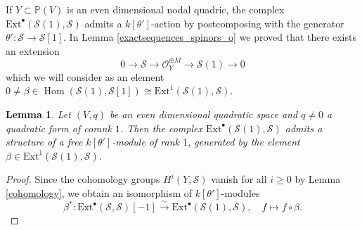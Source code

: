 \documentclass[a4paper, twoside, 11pt]{amsart}
\newtheorem{lemma}[theorem]{Lemma}
\theoremstyle{definition}
\theoremstyle{remark}
\numberwithin{equation}{theorem}
\DeclareMathOperator{\Hom}{Hom}
\begin{document}
If $Y \subset \mathbb{P}(V)$ is an even dimensional nodal quadric, the complex $\mathrm{Ext}^{\bullet}(\mathcal{S}(1), \mathcal{S})$ admits a $k[\theta']$-action by postcomposing with the generator $\theta'\colon \mathcal{S} \to \mathcal{S}[1]$. In Lemma \ref{exactsequences_spinors_o} we proved that there exists an extension
    \begin{equation*}
		0 \longrightarrow \mathcal{S} \longrightarrow \mathcal{O}_Y^{\oplus M} \longrightarrow \mathcal{S}(1)\longrightarrow 0
	\end{equation*}
 which we will consider as an element $0 \neq \beta \in \Hom(\mathcal{S}(1), \mathcal{S}[1]) \cong \mathrm{Ext}^{1}(\mathcal{S}(1), \mathcal{S})$.
\begin{lemma}\label{even_module_structure_twist}
    Let $(V,q)$ be an even dimensional quadratic space and $q\neq 0$ a quadratic form of corank $1$. Then the complex $\mathrm{Ext}^{\bullet}(\mathcal{S}(1), \mathcal{S})$ admits a structure of a free $k[\theta']$-module of rank $1$, generated by the element $\beta \in \mathrm{Ext}^{1}(\mathcal{S}(1), \mathcal{S})$.
\end{lemma}
\begin{proof}
    Since the cohomology groups $H^i(Y, \mathcal{S})$ vanish for all $i \geq 0$ by Lemma \ref{cohomology}, we obtain an isomorphism of $k[\theta']$-modules 
    \begin{equation}\label{even_module_str_iso}
		\beta^*\colon \mathrm{Ext}^{\bullet}(\mathcal{S}, \mathcal{S})[-1]\overset{\sim}{\longrightarrow}\mathrm{Ext}^{\bullet}(\mathcal{S}(1), \mathcal{S}), \quad f \mapsto f\circ \beta.
	\end{equation} 
\end{proof}
\end{document}
